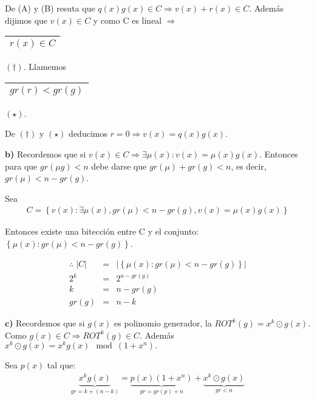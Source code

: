 \documentclass[12pt,a4paper]{report}
\begin{document}
		\vspace{3mm}
		De (A) y (B) resuta que $q(x) g(x) \in C \Rightarrow v(x) + r(x) \in C$. Además dijimos que $v(x) \in C$ y como C es lineal $\Rightarrow$ \begin{tabular}{|c|} \hline $r(x) \in C$ \\ \hline \end{tabular} $(\dag)$. Llamemos \begin{tabular}{|c|} \hline $gr(r) < gr(g) $ \\ \hline \end{tabular} $(\star)$.
		
		\vspace{5mm}
		De $(\dag)$ y $(\star)$ deducimos $r = 0 \Rightarrow v(x) = q(x) g(x)$.
		
		\vspace{5mm}
		\textbf{b)} Recordemos que si $ v(x) \in C \Rightarrow \exists \mu(x) : v(x) = \mu(x) g(x)$. Entonces para que $gr(\mu g) < n$ debe darse que $gr(\mu) + gr(g) < n$, es decir, $gr(\mu) < n - gr(g)$.
		
		\vspace{3mm}
		Sea
		\begin{eqnarray}
			\nonumber C = \left\lbrace v(x) : \exists \mu(x), gr(\mu) < n - gr(g), v(x) = \mu(x) g(x) \right\rbrace
		\end{eqnarray}
		
		Entonces existe una bitección entre C y el conjunto: $\left\lbrace \mu(x) :  gr(\mu) < n - gr(g) \right\rbrace$.
		
		\begin{eqnarray}
			\nonumber \therefore \; \lvert C \rvert &=& \lvert \left\lbrace \mu(x) : gr(\mu) < n - gr(g) \right\rbrace \rvert \\
			\nonumber 2^{k} &=& 2^{n - gr(g)} \\
			\nonumber k &=& n -gr(g) \\
			\nonumber gr(g) &=& n - k
		\end{eqnarray}
		
		\textbf{c)} Recordemos que si $g(x)$ es polinomio generador, la $ROT^{k}(g) = x^{k} \odot g(x)$. Como $g(x) \in C \Rightarrow ROT^{k}(g) \in C$. Además $x^{k} \odot g(x) = x^{k} g(x) \mod (1 + x^{n}).$
		
		Sea $p(x)$ tal que:
		\begin{eqnarray}
			\nonumber \underbrace{x^{k} g(x)}_{gr = k + (n - k)} = \underbrace{p(x) (1 + x^{n})}_{gr = gr(p) + n} + \underbrace{x^{k} \odot g(x)}_{gr < n}
		\end{eqnarray}
		
\end{document}
